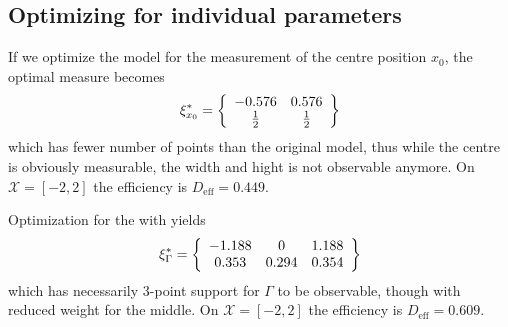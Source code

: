 \documentclass[12pt]{iopart}
\begin{document}
\subsection{Optimizing for individual parameters}

If we optimize the model  for the measurement of the centre position $x_0$, the optimal measure becomes
\begin{equation}
\xi^*_{x_0} = \left\{
  \begin{array}{c c}
    -0.576 & 0.576 \\
    \frac{1}{2} & \frac{1}{2}\\
  \end{array} \right \}
\end{equation}
which has fewer number of points than the original model, thus while the centre is obviously measurable, the width and hight is not observable anymore.  On $\mathcal{X} = [-2,2]$ the efficiency is $D_\mathrm{eff} = 0.449$.

Optimization for the with yields
\begin{equation}
\xi^*_{\Gamma} = \left\{
  \begin{array}{c c c}
    -1.188 & 0 &  1.188 \\
    0.353 & 0.294 & 0.354\\
  \end{array} \right \}
\end{equation}
which has necessarily 3-point support for $\Gamma$ to be observable, though with reduced weight for the middle. On $\mathcal{X} = [-2,2]$ the efficiency is $D_\mathrm{eff} = 0.609$.
\end{document}
